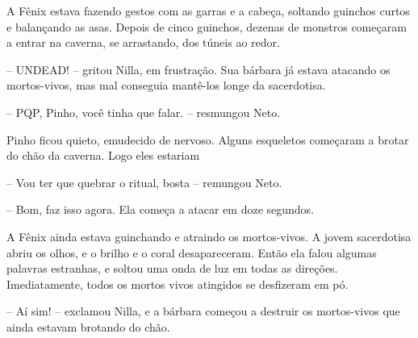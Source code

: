 A Fênix estava fazendo gestos com as garras e a cabeça, soltando guinchos curtos e balançando as asas.
Depois de cinco guinchos, dezenas de monstros começaram a entrar na caverna, se arrastando, dos túneis ao redor.

-- UNDEAD! -- gritou Nilla, em frustração. Sua bárbara já estava atacando os mortos-vivos, mas mal conseguia mantê-los longe da sacerdotisa.

-- PQP, Pinho, você tinha que falar. -- resmungou Neto.

Pinho ficou quieto, emudecido de nervoso. Alguns esqueletos começaram a brotar do chão da caverna. Logo eles estariam 

-- Vou ter que quebrar o ritual, bosta -- remungou Neto.

-- Bom, faz isso agora. Ela começa a atacar em doze segundos.

A Fênix ainda estava guinchando e atraindo os mortos-vivos. A jovem sacerdotisa abriu os olhos, e o brilho e o coral
desapareceram. Então ela falou algumas palavras estranhas, e soltou uma onda de luz em todas as direções. Imediatamente,
todos os mortos vivos atingidos se desfizeram em pó.

-- Aí sim! -- exclamou Nilla, e a bárbara começou a destruir os mortos-vivos que ainda estavam brotando do chão.
